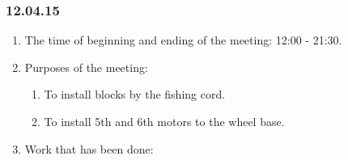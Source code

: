 \subsubsection{12.04.15}
\begin{enumerate}
	
	\item The time of beginning and ending of the meeting: 12:00 - 21:30.
	
	\item Purposes of the meeting: 
	\begin{enumerate}
		
		\item To install blocks by the fishing cord.
		
		\item To install 5th and 6th motors to the wheel base.

	\end{enumerate}

	\item Work that has been done:
	\begin{enumerate}
		

\end{enumerate}
\end{enumerate}
